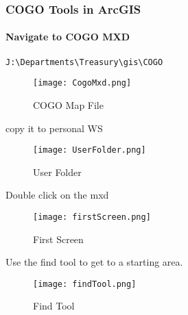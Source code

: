 %
%
%
 \def\titlename{Parcel Editing with COGO in ArcGIS}
 \def\authorName{Allegan County GIS Services}
 \def\pdfTitle{Parcel Editing with COGO in ArcGIS}
 \def\pdfSubject{GIS Tools} %
 \def\pdfKeywords{mobile,gis}

 
  
  
\subsubsection[COGO Tools in ArcGIS]{COGO Tools in ArcGIS}
\vspace{.1in}

\paragraph[Navigate to COGO MXD ]{\textbf{Navigate to COGO MXD}}
 \begin{verbatim}
J:\Departments\Treasury\gis\COGO
\end{verbatim}

\begin{figure}[h!]
\centering
    \texttt{[image: CogoMxd.png]}

\caption{COGO Map File}
\end{figure}
%
\clearpage  


copy it to personal WS

\begin{figure}[h!]
\centering
    \texttt{[image: UserFolder.png]}

\caption{User Folder}
\end{figure}
%
\clearpage  



Double click on the mxd

\begin{figure}[h!]
\centering
    \texttt{[image: firstScreen.png]}

\caption{First Screen}
\end{figure}
%
\clearpage 


Use the find tool to get to a starting area.
\begin{figure}[h!]
\centering
    \texttt{[image: findTool.png]}

\caption{Find Tool}
\end{figure}
%
\clearpage 


